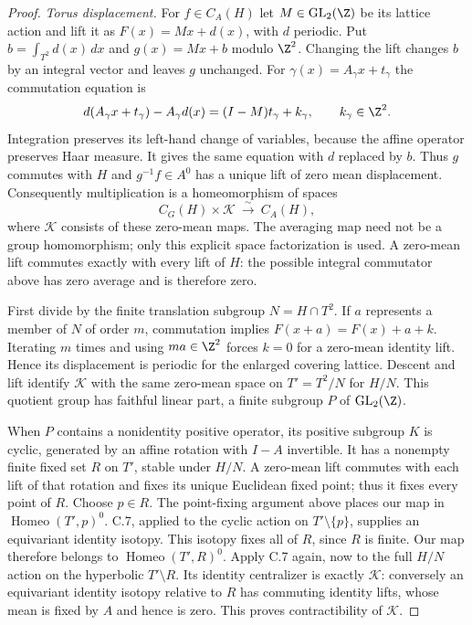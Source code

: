 \begin{proof}
\emph{Torus displacement.}
For $f\in C_A(H)$ let $M\in\operatorname{GL}_2(\Z)$ be its lattice
action and lift it as $F(x)=Mx+d(x)$, with $d$ periodic. Put
$b=\int_{T^2}d(x)\,dx$ and $g(x)=Mx+b$ modulo $\Z^2$.
Changing the lift changes $b$ by an integral vector and leaves $g$
unchanged. For $\gamma(x)=A_\gamma x+t_\gamma$ the commutation equation
is
\[
 d(A_\gamma x+t_\gamma)-A_\gamma d(x)
       =(I-M)t_\gamma+k_\gamma,\qquad k_\gamma\in\Z^2.
\]
Integration preserves its left-hand change of variables, because the
affine operator preserves Haar measure. It gives the same equation
with $d$ replaced by $b$. Thus $g$ commutes with $H$ and
$g^{-1}f\in A^0$ has a unique lift of zero mean displacement.
Consequently multiplication is a homeomorphism of spaces
\[
 C_G(H)\times\mathcal K\ \xrightarrow{\sim}\ C_A(H),
\]
where $\mathcal K$ consists of these zero-mean maps. The averaging
map need not be a group homomorphism; only this explicit space
factorization is used. A zero-mean lift commutes exactly with every
lift of $H$: the possible integral commutator above has zero average
and is therefore zero.

First divide by the finite translation subgroup $N=H\cap T^2$.
If $a$ represents a member of $N$ of order $m$, commutation implies
$F(x+a)=F(x)+a+k$. Iterating $m$ times and using $ma\in\Z^2$
forces $k=0$ for a zero-mean identity lift. Hence its displacement is
periodic for the enlarged covering lattice. Descent and lift identify
$\mathcal K$ with the same zero-mean space on $T'=T^2/N$ for $H/N$.
This quotient group has faithful linear part, a finite subgroup $P$
of $\operatorname{GL}_2(\Z)$.

When $P$ contains a nonidentity positive operator, its positive subgroup
$K$ is cyclic, generated by an affine rotation with $I-A$ invertible.
It has a nonempty finite fixed set $R$ on $T'$, stable under $H/N$.
A zero-mean lift commutes with each lift of that rotation and fixes its
unique Euclidean fixed point; thus it fixes every point of $R$.
Choose $p\in R$. The point-fixing argument above places our map in
$\operatorname{Homeo}(T',p)^0$. C.7, applied to the cyclic action on
$T'\setminus\{p\}$, supplies an equivariant identity isotopy. This
isotopy fixes all of $R$, since $R$ is finite. Our map therefore belongs
to $\operatorname{Homeo}(T',R)^0$. Apply C.7 again, now to the full
$H/N$ action on the hyperbolic $T'\setminus R$. Its identity centralizer
is exactly $\mathcal K$: conversely an equivariant identity isotopy
relative to $R$ has commuting identity lifts, whose mean is fixed by
$A$ and hence is zero. This proves contractibility of $\mathcal K$.


\end{proof}
